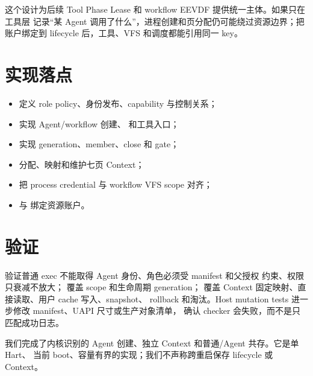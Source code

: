 这个设计为后续 Tool Phase Lease 和 workflow EEVDF 提供统一主体。如果只在工具层
记录“某 Agent 调用了什么”，进程创建和页分配仍可能绕过资源边界；把账户绑定到
lifecycle 后，工具、VFS 和调度都能引用同一 key。

\section{实现落点}

\begin{itemize}
  \item {} 定义 role policy、身份发布、capability 与控制关系；
  \item {} 实现 Agent/workflow 创建、 和工具入口；
  \item {} 实现 generation、member、close 和 gate；
  \item {} 分配、映射和维护七页 Context；
  \item {} 把 process credential 与 workflow VFS scope 对齐；
  \item {} 与  绑定资源账户。
\end{itemize}

\section{验证}

 验证普通 exec 不能取得 Agent 身份、角色必须受 manifest 和父授权
约束、权限只衰减不放大； 覆盖 scope 和生命周期 generation；
 覆盖 Context 固定映射、直接读取、用户 cache 写入、snapshot、
rollback 和淘汰。Host mutation tests 进一步修改 manifest、UAPI 尺寸或生产对象清单，
确认 checker 会失败，而不是只匹配成功日志。

\begin{evidencebox}[任务一结论]
我们完成了内核识别的 Agent 创建、独立 Context 和普通/Agent 共存。它是单 Hart、
当前 boot、容量有界的实现；我们不声称跨重启保存 lifecycle 或 Context。
\end{evidencebox}
